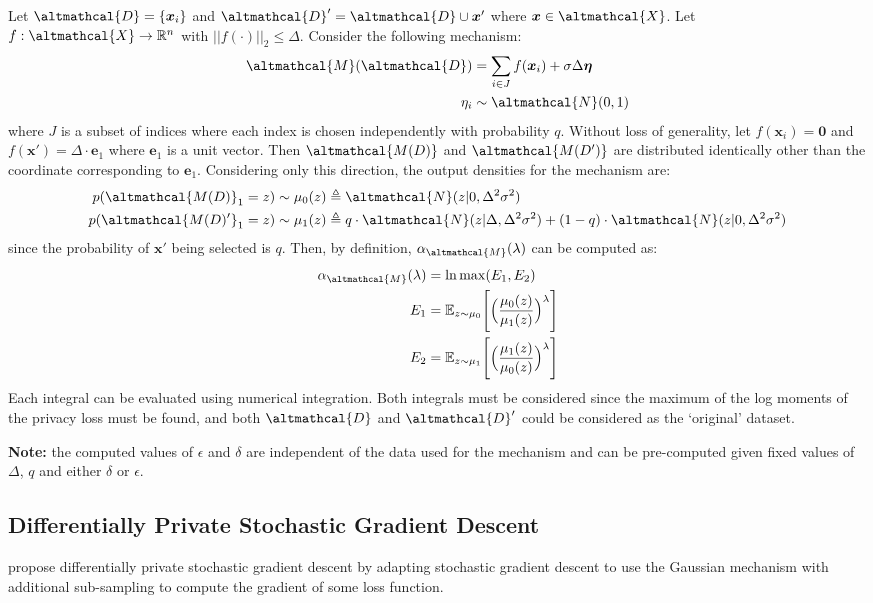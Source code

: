 Let $\altmathcal{D} = \lbrace \bm{x}_i \rbrace$ and $\altmathcal{D}' = \altmathcal{D} \cup \bm{x}'$ where $\bm{x} \in \altmathcal{X}$. Let $f: \altmathcal{X} \rightarrow \mathbb{R}^n$ with $||f(\cdot)||_2 \leq \Delta$. Consider the following mechanism:
\begin{align}
\altmathcal{M}(\altmathcal{D}) &= \sum_{i \in J} f(\bm{x}_i) + \sigma \Delta \bm{\eta} \\ 
\eta_i &\sim \altmathcal{N}(0, 1) \nonumber
\end{align}
where $J$ is a subset of indices where each index is chosen independently with probability $q$. Without loss of generality, let $f(\bm{x}_i) = \bm{0}$ and $f(\bm{x}') = \Delta\cdot\bm{e}_1$ where $\bm{e}_1$ is a unit vector. Then $\altmathcal{M(D)}$ and  $\altmathcal{M(D')}$ are distributed identically other than the coordinate corresponding to $\bm{e}_1$. Considering only this direction, the output densities for the mechanism are:
\begin{align}
p(\altmathcal{M(D)}_1 = z )\sim \mu_0(z) &\triangleq \altmathcal{N}(z| 0, \Delta^2 \sigma^2) \\ p(\altmathcal{M(D)'}_1 = z) \sim \mu_1(z) &\triangleq q\cdot\altmathcal{N}(z| \Delta, \Delta^2 \sigma^2) + (1-q)\cdot\altmathcal{N}(z| 0, \Delta^2 \sigma^2) 
\end{align}
since the probability of $\bm{x}'$ being selected is $q$. Then, by definition, $\alpha_\altmathcal{M}(\lambda)$ can be computed as:
\begin{align}
\alpha_\altmathcal{M}(\lambda) &= \ln \max (E_1, E_2) \\
E_1 &= \mathbb{E}_{z \sim \mu_0} \Bigg[ \Big(\frac{\mu_0(z)}{\mu_1(z)}\Big)^\lambda \Bigg] \\
E_2 &= \mathbb{E}_{z \sim \mu_1} \Bigg[ \Big(\frac{\mu_1(z)}{\mu_0(z)}\Big)^\lambda \Bigg]
\end{align}
Each integral can be evaluated using numerical integration. Both integrals must be considered since the maximum of the log moments of the privacy loss must be found, and both $\altmathcal{D}$ and $\altmathcal{D}'$ could be considered as the `original' dataset.

\textbf{Note: }the computed values of $\epsilon$ and $\delta$ are independent of the data used for the mechanism and can be pre-computed given fixed values of $\Delta$, $q$ and either $\delta$ or $\epsilon$. 

\subsection{Differentially Private Stochastic Gradient Descent}
\cite{moments_account} propose differentially private stochastic gradient descent by adapting stochastic gradient descent to use the Gaussian mechanism with additional sub-sampling to compute the gradient of some loss function. 

